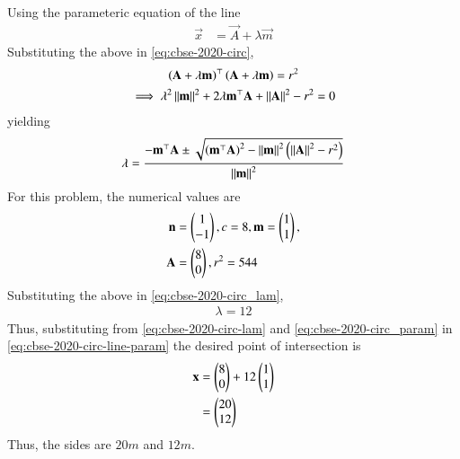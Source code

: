 \documentclass[journal,12pt,twocolumn]{IEEEtran}
\renewcommand\thesection{\arabic{section}}
\begin{document}
\begin{enumerate}[label=\thesection.\arabic*.,ref=\thesection.\theenumi]
		    Using the parameteric equation of the line 
		    \begin{align}
			    \label{eq:cbse-2020-circ-line-param}
			    \vec{x} &= \vec{A} + \lambda \vec{m}
		    \end{align}
			    Substituting the above in \eqref{eq:cbse-2020-circ}, 
		    \begin{multline}
			    \left( \mathbf{A} + \lambda \mathbf{m}\right)^{\top}
			    \left( \mathbf{A} + \lambda \mathbf{m}\right)
			    = r^2
			    \\
			    \implies \lambda^2\left\lVert\mathbf{m}\right\rVert^2+ 2 \lambda \mathbf{m}^{\top}\mathbf{A}
			    +\left\lVert\mathbf{A}\right\rVert^2 - r^2 = 0
		    \end{multline}
		    yielding 
		    {\small
		    \begin{align}
			    \label{eq:cbse-2020-circ_lam}
		\lambda = \frac{-\mathbf{m}^{\top}\mathbf{A}\pm \sqrt{\left(\mathbf{m}^{\top}\mathbf{A}\right)^2 -\left\lVert\mathbf{m}\right\rVert^2\left(\left\lVert\mathbf{A}\right\rVert^2 - r^2 \right)}}{\left\lVert\mathbf{m}\right\rVert^2}
		    \end{align}
		    }
		    For this problem, the numerical values are
		    \begin{align}
			    \label{eq:cbse-2020-circ_param}
			    \mathbf{n} &= \begin{pmatrix}1 \\ -1\end{pmatrix}, c = 8, 
		\mathbf{m} = \begin{pmatrix}1 \\ 1\end{pmatrix}, 
			    \\
			     \mathbf{A} &= \begin{pmatrix}8 \\ 0\end{pmatrix},  r^2 = 544
		    \end{align}
		    Substituting the above in 
			    \eqref{eq:cbse-2020-circ_lam}, 
		    \begin{align}
			    \lambda = 12
			    \label{eq:cbse-2020-circ-lam}
		    \end{align}
		    Thus, substituting from 
			    \eqref{eq:cbse-2020-circ-lam}
			    and 
			    \eqref{eq:cbse-2020-circ_param}
			    in 
			    \eqref{eq:cbse-2020-circ-line-param}
			    the desired point of intersection is 
		    \begin{align}
			    \mathbf{x} &= \begin{pmatrix}8 \\ 0\end{pmatrix} +  12 \begin{pmatrix}1 \\ 1\end{pmatrix}
			    \\
			    &= \begin{pmatrix}20 \\ 12\end{pmatrix}
		    \end{align}
		    Thus, the sides are $20m$ and $12m$.


\end{enumerate}
\end{document}
